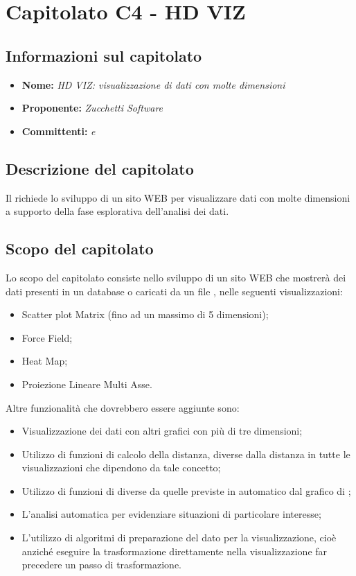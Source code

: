 \section{Capitolato C4 - HD VIZ}\label{C4}
\subsection{Informazioni sul capitolato}
\begin{itemize}
	\item \textbf{Nome:} \textit{HD VIZ: visualizzazione di dati con molte dimensioni}
	\item \textbf{Proponente:} \textit{Zucchetti Software}
	\item \textbf{Committenti:} \textit{\VT{} e \CR{}}
\end{itemize}

\subsection{Descrizione del capitolato}
Il  richiede lo sviluppo di un sito WEB per visualizzare dati con molte dimensioni a supporto della fase esplorativa dell'analisi dei dati.

\subsection{Scopo del capitolato}
Lo scopo del capitolato consiste nello sviluppo di un sito WEB che mostrerà dei dati presenti in un database o caricati da un file , nelle seguenti visualizzazioni:
\begin{itemize}
	\item Scatter plot Matrix (fino ad un massimo di 5 dimensioni);
	\item Force Field;
	\item Heat Map;
	\item Proiezione Lineare Multi Asse.
\end{itemize}
Altre funzionalità che dovrebbero essere aggiunte sono:
\begin{itemize}
	\item Visualizzazione dei dati con altri grafici con più di tre dimensioni;
	\item Utilizzo di funzioni di calcolo della distanza, diverse dalla distanza  in tutte le visualizzazioni che dipendono da tale concetto;
	\item Utilizzo di funzioni di  diverse da quelle previste in automatico dal grafico  di ;
	\item L'analisi automatica per evidenziare situazioni di particolare interesse;
	\item L'utilizzo di algoritmi di preparazione del dato per la visualizzazione, cioè anziché eseguire la trasformazione direttamente nella visualizzazione far precedere un passo di trasformazione.
\end{itemize}

